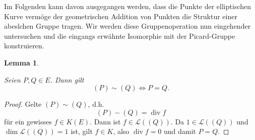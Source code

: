 \documentclass{amsart}
\theoremstyle{plain}
\newtheorem{lemma}[subsection]{Lemma}
\theoremstyle{definition}
\newcommand{\divop}{\operatorname{div}}
\newcommand{\riemannspace}{\mathcal{L}}
\begin{document}
Im Folgenden kann davon ausgegangen werden, dass die Punkte der elliptischen Kurve vermöge der geometrischen Addition von Punkten die Struktur einer abeslchen Gruppe tragen.
Wir werden diese Gruppenoperation nun eingehender untersuchen und die eingangs erwähnte Isomorphie mit der Picard-Gruppe konstruieren.

\begin{lemma}
	\label{lem-divisor-aequivalenz}

	Seien $P, Q \in E$. Dann gilt
	\begin{equation*}
		(P) \sim (Q) \Leftrightarrow P = Q.
	\end{equation*}
\end{lemma}
\begin{proof}
	Gelte $(P) \sim (Q)$, d.h.
	\begin{equation*}
		(P) - (Q) = \divop f
	\end{equation*}
	für ein gewisses $f \in K(E)$. Dann ist $f \in \riemannspace((Q))$.
	Da $1 \in \riemannspace((Q))$ und $\dim \riemannspace((Q)) = 1$ ist, gilt $f \in K$, also $\divop f = 0$ und damit $P = Q$.
\end{proof}
\end{document}
